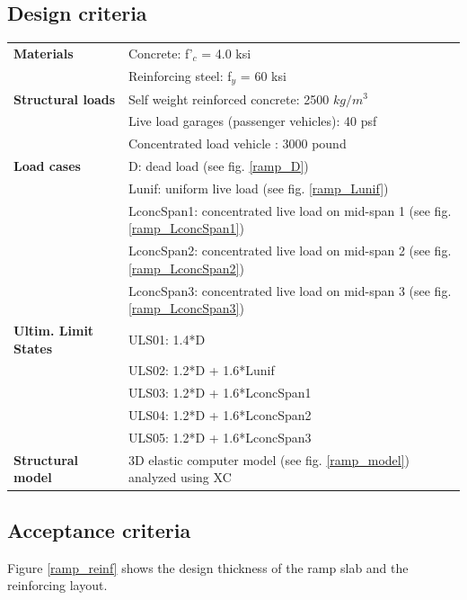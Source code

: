 \subsection{Design criteria} \label{ramp_desCrit}
\begin{center}
\begin{tabular}{lp{9cm}}
  \textbf{Materials} & Concrete: f'$_c$ = 4.0 ksi\\
  & Reinforcing steel: f$_y$ = 60 ksi \\
  \textbf{Structural loads} & Self weight reinforced concrete: 2500 $kg/m^3$\\
  & Live load garages (passenger vehicles): 40 psf \\
  & Concentrated load vehicle : 3000 pound \\
  \textbf{Load cases} & D: dead load (see fig. \ref{ramp_D}) \\
  & Lunif: uniform live load (see fig. \ref{ramp_Lunif}) \\
  & LconcSpan1: concentrated live load on mid-span 1 (see fig. \ref{ramp_LconcSpan1}) \\
  & LconcSpan2: concentrated live load on mid-span 2 (see fig. \ref{ramp_LconcSpan2}) \\
  & LconcSpan3: concentrated live load on mid-span 3 (see fig. \ref{ramp_LconcSpan3}) \\
  \textbf{Ultim. Limit States} & ULS01: 1.4*D \\
  & ULS02: 1.2*D + 1.6*Lunif \\
  & ULS03: 1.2*D + 1.6*LconcSpan1 \\
  & ULS04: 1.2*D + 1.6*LconcSpan2 \\
  & ULS05: 1.2*D + 1.6*LconcSpan3 \\
 
  \textbf{Structural model} & 3D elastic computer model (see fig. \ref{ramp_model}) analyzed using XC \\
\end{tabular}
\end{center}

\subsection{Acceptance criteria}
Figure \ref{ramp_reinf} shows the design thickness of the ramp slab and the reinforcing layout.

